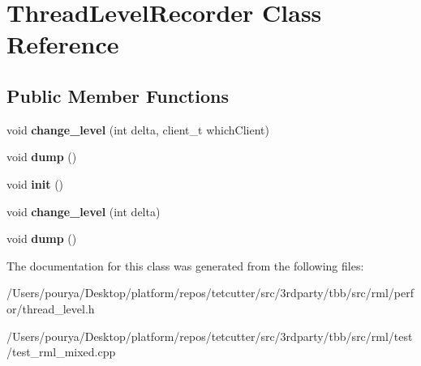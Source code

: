 \hypertarget{classThreadLevelRecorder}{}\section{Thread\+Level\+Recorder Class Reference}
\label{classThreadLevelRecorder}
\subsection*{Public Member Functions}
\begin{DoxyCompactItemize}
\item 
\hypertarget{classThreadLevelRecorder_adaa9c5546adba830287c630e8fbd8bca}{}void {\bfseries change\+\_\+level} (int delta, client\+\_\+t which\+Client)\label{classThreadLevelRecorder_adaa9c5546adba830287c630e8fbd8bca}

\item 
\hypertarget{classThreadLevelRecorder_a4741e2b6c77f747f1dd70364aaf16073}{}void {\bfseries dump} ()\label{classThreadLevelRecorder_a4741e2b6c77f747f1dd70364aaf16073}

\item 
\hypertarget{classThreadLevelRecorder_a7f9686d4797aaea70f7d90e170d68b8f}{}void {\bfseries init} ()\label{classThreadLevelRecorder_a7f9686d4797aaea70f7d90e170d68b8f}

\item 
\hypertarget{classThreadLevelRecorder_a80d5c83cb33e2d088f6796e168f68974}{}void {\bfseries change\+\_\+level} (int delta)\label{classThreadLevelRecorder_a80d5c83cb33e2d088f6796e168f68974}

\item 
\hypertarget{classThreadLevelRecorder_a4741e2b6c77f747f1dd70364aaf16073}{}void {\bfseries dump} ()\label{classThreadLevelRecorder_a4741e2b6c77f747f1dd70364aaf16073}

\end{DoxyCompactItemize}


The documentation for this class was generated from the following files\+:\begin{DoxyCompactItemize}
\item 
/\+Users/pourya/\+Desktop/platform/repos/tetcutter/src/3rdparty/tbb/src/rml/perfor/thread\+\_\+level.\+h\item 
/\+Users/pourya/\+Desktop/platform/repos/tetcutter/src/3rdparty/tbb/src/rml/test/test\+\_\+rml\+\_\+mixed.\+cpp\end{DoxyCompactItemize}
